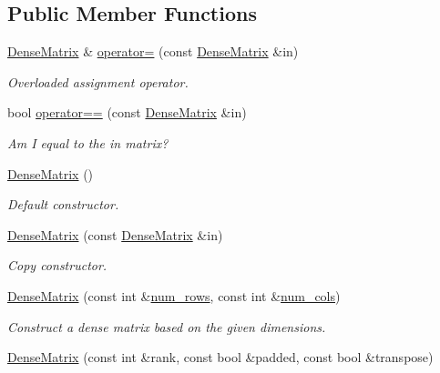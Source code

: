 \subsection*{Public Member Functions}
\begin{DoxyCompactItemize}
\item 
\hyperlink{classmtk_1_1DenseMatrix}{Dense\+Matrix} \& \hyperlink{classmtk_1_1DenseMatrix_a0d27dc7c4d2c49f391017e392345ced0}{operator=} (const \hyperlink{classmtk_1_1DenseMatrix}{Dense\+Matrix} \&in)
\begin{DoxyCompactList}\small\item\em Overloaded assignment operator. \end{DoxyCompactList}\item 
bool \hyperlink{classmtk_1_1DenseMatrix_a94ab5a02d9cf81c17b6f68f4c41cb797}{operator==} (const \hyperlink{classmtk_1_1DenseMatrix}{Dense\+Matrix} \&in)
\begin{DoxyCompactList}\small\item\em Am I equal to the in matrix? \end{DoxyCompactList}\item 
\hyperlink{classmtk_1_1DenseMatrix_a0c75ee704707983f935b02835eab0933}{Dense\+Matrix} ()
\begin{DoxyCompactList}\small\item\em Default constructor. \end{DoxyCompactList}\item 
\hyperlink{classmtk_1_1DenseMatrix_a90102d605a668bf7ecf0d766cc4c10db}{Dense\+Matrix} (const \hyperlink{classmtk_1_1DenseMatrix}{Dense\+Matrix} \&in)
\begin{DoxyCompactList}\small\item\em Copy constructor. \end{DoxyCompactList}\item 
\hyperlink{classmtk_1_1DenseMatrix_abe26c623467fc1b293cf4f22a3a47cc8}{Dense\+Matrix} (const int \&\hyperlink{classmtk_1_1DenseMatrix_a17d8d3b9cc0926044b6972dd190a5c21}{num\+\_\+rows}, const int \&\hyperlink{classmtk_1_1DenseMatrix_af6f78373aaf2136f0c78974d7c8de0a8}{num\+\_\+cols})
\begin{DoxyCompactList}\small\item\em Construct a dense matrix based on the given dimensions. \end{DoxyCompactList}\item 
\hyperlink{classmtk_1_1DenseMatrix_a4ef0dec1b5558fcf00719bfac059ec68}{Dense\+Matrix} (const int \&rank, const bool \&padded, const bool \&transpose)

\end{DoxyCompactItemize}
